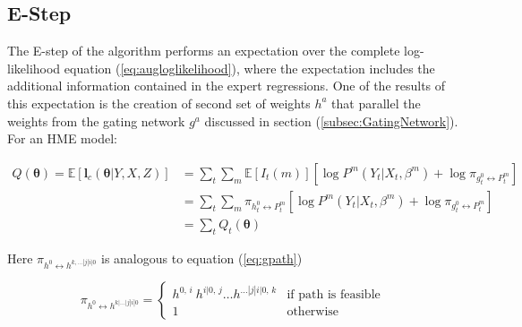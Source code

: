 \documentclass[12pt]{article}
\newcommand{\gateprod}[2]{\pi_{#1 \longleftrightarrow #2}}
\begin{document}


\subsection{E-Step}
The E-step of the algorithm performs an expectation over the complete
log-likelihood equation (\ref{eq:augloglikelihood}), where the expectation
includes the additional information contained in the expert regressions.
One of the results of this expectation is the creation of second set of
weights $h^{a}$ that parallel the weights from the gating network $g^{a}$
discussed in section (\ref{subsec:GatingNetwork}). For an HME model:

\begin{equation} \label{eq:Estep}
  \begin{split}
  Q(\boldsymbol{\theta}) = \mathbb{E} \left [ \boldsymbol{l}_{c}(\boldsymbol{\theta}|Y,X,Z) \right] & = \sum_{t}\sum_{m} \mathbb{E} \left[ I_{t}(m) \right] \left[ \log P^{m}(Y_{t}|X_{t}, \beta^{m}) + \log \gateprod{g^{0}_{t}}{P^{m}_{t}} \right] \\ 
   & = \sum_{t} \sum_{m} \gateprod{h^{0}_{t}}{P^{m}_{t}} \left[ \log P^{m}(Y_{t}|X_{t},\beta^{m}) + \log \gateprod{g^{0}_{t}}{P^{m}_{t}} \right] \\
   & = \sum_{t} Q_{t}(\boldsymbol{\theta})
 \end{split}
\end{equation}

Here $\gateprod{h^{0}}{h^{k,\dots|j|i|0}}$ is analogous to equation (\ref{eq:gpath})

\begin{equation} \label{eq:hpath}
  \gateprod{h^{0}}{h^{k|\ldots|j|i|0}} =
    \begin{cases} 
       h^{0, \, i} \ h^{i|0, \, j} \ldots h^{\dots|j|i|0, \, k} & \textrm{if path is feasible} \\
       1 & \textrm{otherwise}
    \end{cases}
\end{equation}
\end{document}
